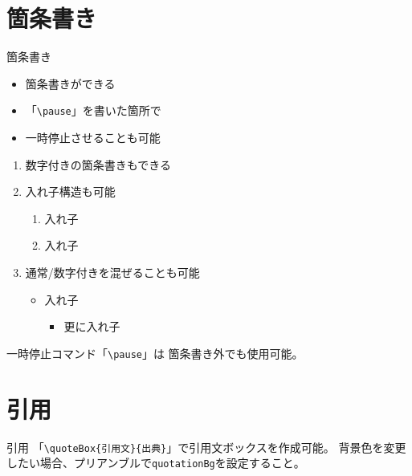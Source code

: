 \documentclass[
    aspectratio=169,   %
    xcolor={           %
        rgb,           %
        svgnames},     %
    unicode,           %
    12pt,              %
    unknownkeysallowed %
]{beamer}
\begin{document}
\section{箇条書き}

\begin{frame}[fragile]{箇条書き}
  \begin{itemize}
    \item 箇条書きができる
    \pause
    \item 「\verb|\pause|」を書いた箇所で
    \pause
    \item 一時停止させることも可能
  \end{itemize}
  \pause
  \begin{enumerate}
    \item 数字付きの箇条書きもできる
    \item 入れ子構造も可能
    \begin{enumerate}
      \item 入れ子
      \item 入れ子
    \end{enumerate}
    \item 通常/数字付きを混ぜることも可能
    \begin{itemize}
      \item 入れ子
      \begin{itemize}
        \item 更に入れ子
      \end{itemize}
    \end{itemize}
  \end{enumerate}
  \pause
  一時停止コマンド「\verb|\pause|」は
  \pause
  箇条書き外でも使用可能。
\end{frame}


\section{引用}

\begin{frame}[fragile]{引用}
  「\verb|\quoteBox{引用文}{出典}|」で引用文ボックスを作成可能。
  背景色を変更したい場合、プリアンブルで\verb|quotationBg|を設定すること。\\
\end{frame}
\end{document}
